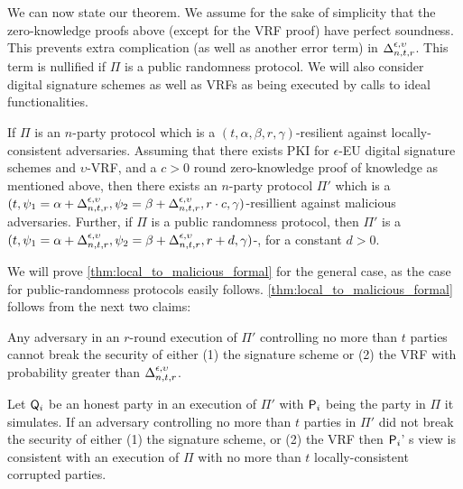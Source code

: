 We can now state our theorem. We assume for the sake of simplicity that the zero-knowledge proofs above (except for the VRF proof) have perfect soundness.  This prevents extra complication (as well as another error term) in $\Delta^{\epsilon,\upsilon}_{n,t,r}$. This term is nullified if $\Pi$ is a public randomness protocol. We will also consider digital signature schemes as well as VRFs as being executed by calls to ideal functionalities.

\begin{theorem}\label{thm:local_to_malicious_formal}
	If $\Pi$ is an $n$-party protocol which is a $(t,\alpha,\beta,r,\gamma)$-\BA resilient against locally-consistent adversaries. Assuming that there exists PKI for $\epsilon$-EU digital signature schemes and $\upsilon$-VRF, and a $c>0$ round zero-knowledge proof of knowledge as mentioned above, then there exists an $n$-party protocol $\Pi'$ which is a $(t,\psi_1 = \alpha + \Delta^{\epsilon,\upsilon}_{n,t,r},\psi_2 = \beta + \Delta^{\epsilon,\upsilon}_{n,t,r},r \cdot c,\gamma)$-\BA resillient against malicious adversaries. Further, if $\Pi$ is a public randomness protocol, then $\Pi'$ is a $(t,\psi_1 = \alpha + \Delta^{\epsilon,\upsilon}_{n,t,r},\psi_2 = \beta + \Delta^{\epsilon,\upsilon}_{n,t,r},r + d,\gamma)$-\BA, for a constant $d > 0$.
\end{theorem}

 
We will prove \cref{thm:local_to_malicious_formal} for the general case, as the case for public-randomness protocols easily follows. \cref{thm:local_to_malicious_formal} follows from the next two claims:

\begin{claim}\label{clm:locally_consistent_adversaries}
	Any adversary in an $r$-round execution of $\Pi'$ controlling no more than $t$ parties cannot break the security of either (1) the signature scheme or (2) the VRF with probability greater than $\Delta^{\epsilon,\upsilon}_{n,t,r}$.
\end{claim}

\begin{claim}\label{clm:locally_consistent_view}
	Let $\mathsf{Q}_i$ be an honest party in an execution of $\Pi'$ with $\mathsf{P}_i$ being the party in $\Pi$ it simulates. If an adversary controlling no more than $t$ parties in $\Pi'$ did not break the security of either (1) the signature scheme, or (2) the VRF then $\mathsf{P}_i$' s view is consistent with an execution of $\Pi$ with no more than $t$ locally-consistent corrupted parties.
\end{claim}

